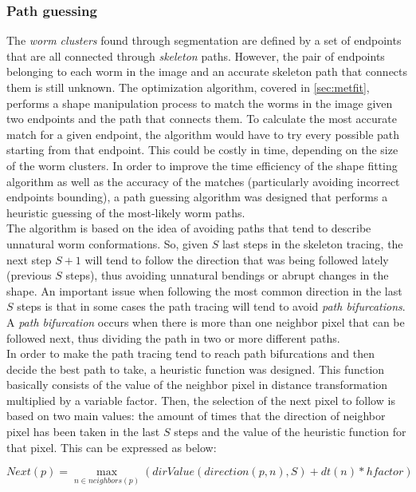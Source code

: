 \subsubsection*{Path guessing}
\label{sec:pathguessing}

The \emph{worm clusters} found through segmentation are defined by a set of endpoints
that are all connected through \emph{skeleton} paths. However, the pair of 
endpoints belonging to each worm in the image and an accurate skeleton 
path that
connects them is still unknown. The optimization algorithm, covered in \ref{sec:metfit},
performs a shape manipulation process to match the worms in the image given two endpoints
and the path that connects them. To calculate the most accurate match for a 
given endpoint, the algorithm would have to try every possible path starting
from that endpoint. This could be costly in time, depending on the size of
the worm clusters. In order to improve the time efficiency of the 
shape fitting algorithm as well as the accuracy of the matches 
(particularly avoiding incorrect endpoints bounding), 
a path guessing algorithm was designed that performs a heuristic
guessing of the most-likely worm paths.\\

The algorithm is based on the idea of avoiding paths that tend to describe 
unnatural worm conformations. So, given $S$ last steps in the skeleton tracing, 
the next step $S+1$ will tend to follow the direction that was being followed
lately (previous $S$ steps), 
thus avoiding unnatural bendings or abrupt changes in the shape. 
An important issue when following the most common direction in the 
last $S$ steps is that in some cases
the path tracing will tend to avoid \emph{path bifurcations}. 
A \emph{path bifurcation} occurs when there is more than one neighbor pixel that can be 
followed next, thus dividing the path in two or more different paths.\\

In order to make the path tracing tend to reach path bifurcations and then decide the best
path to take, a heuristic function was designed. This function basically 
consists of the value of the neighbor pixel
in distance transformation multiplied by a variable factor.
Then, the selection of the next pixel to follow is based on two main values:
the amount of times that the direction of neighbor pixel has been taken in the last $S$ steps and
the value of the heuristic function for that pixel. This can be expressed as below:

$$Next(p) = \max_{n \in neighbors(p)} (dirValue(direction(p,n),S) + dt(n)*hfactor)$$

